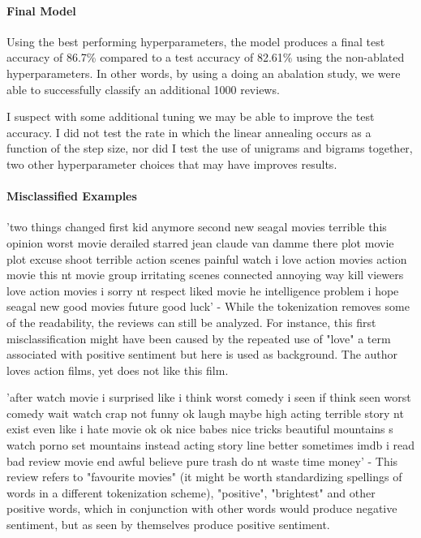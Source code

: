 \documentclass[11pt]{article}
\begin{document}
    \paragraph{Final Model}\label{final-model}

Using the best performing hyperparameters, the model produces a final
test accuracy of 86.7\% compared to a test accuracy of 82.61\% using the
non-ablated hyperparameters. In other words, by using a doing an
abalation study, we were able to successfully classify an additional
1000 reviews.

I suspect with some additional tuning we may be able to improve the test
accuracy. I did not test the rate in which the linear annealing occurs
as a function of the step size, nor did I test the use of unigrams and
bigrams together, two other hyperparameter choices that may have
improves results.

    \paragraph{Misclassified Examples}\label{misclassified-examples}

'two things changed first kid anymore second new seagal movies terrible
this opinion worst movie derailed starred jean claude van damme there
plot movie plot excuse shoot terrible action scenes painful watch i love
action movies action movie this nt movie group irritating scenes
connected annoying way kill viewers love action movies i sorry nt
respect liked movie he intelligence problem i hope seagal new good
movies future good luck' - While the tokenization removes some of the
readability, the reviews can still be analyzed. For instance, this first
misclassification might have been caused by the repeated use of "love" a
term associated with positive sentiment but here is used as background.
The author loves action films, yet does not like this film.

'after watch movie i surprised like i think worst comedy i seen if think
seen worst comedy wait watch crap not funny ok laugh maybe high acting
terrible story nt exist even like i hate movie ok ok nice babes nice
tricks beautiful mountains s watch porno set mountains instead acting
story line better sometimes imdb i read bad review movie end awful
believe pure trash do nt waste time money' - This review refers to
"favourite movies" (it might be worth standardizing spellings of words
in a different tokenization scheme), "positive", "brightest" and other
positive words, which in conjunction with other words would produce
negative sentiment, but as seen by themselves produce positive
sentiment.
\end{document}
